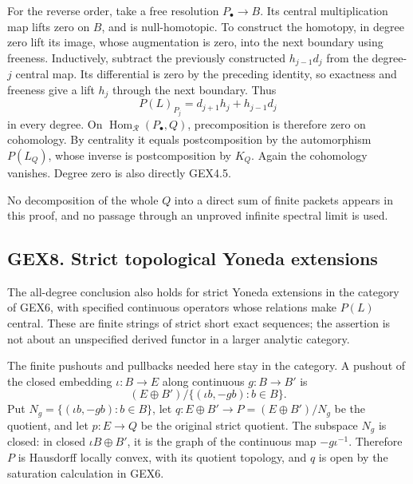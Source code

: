 For the reverse order, take a free resolution \(P_\bullet\to B\). Its
central multiplication map lifts zero on \(B\), and is null-homotopic.
To construct the homotopy, in degree zero lift its image, whose
augmentation is zero, into the next boundary using freeness.
Inductively, subtract the previously constructed \(h_{j-1}d_j\) from the
degree-\(j\) central map. Its differential is zero by the preceding
identity, so exactness and freeness give a lift \(h_j\) through the next
boundary. Thus \[
P(L)_{P_j}=d_{j+1}h_j+h_{j-1}d_j
\] in every degree. On \(\operatorname{Hom}_{\mathscr R}(P_\bullet,Q)\),
precomposition is therefore zero on cohomology. By centrality it equals
postcomposition by the automorphism \(P(L_Q)\), whose inverse is
postcomposition by \(K_Q\). Again the cohomology vanishes. Degree zero
is also directly GEX4.5.

No decomposition of the whole \(Q\) into a direct sum of finite packets
appears in this proof, and no passage through an unproved infinite
spectral limit is used.

\subsection{GEX8. Strict topological Yoneda
extensions}\label{gex8.-strict-topological-yoneda-extensions}

The all-degree conclusion also holds for strict Yoneda extensions in the
category of GEX6, with specified continuous operators whose relations
make \(P(L)\) central. These are finite strings of strict short exact
sequences; the assertion is not about an unspecified derived functor in
a larger analytic category.

The finite pushouts and pullbacks needed here stay in the category. A
pushout of the closed embedding \(\iota:B\to E\) along continuous
\(g:B\to B'\) is \[
(E\oplus B')/\{(\iota b,-gb):b\in B\}.
\tag{GEX8.1}
\] Put \(N_g=\{(\iota b,-gb):b\in B\}\), let
\(q:E\oplus B'\to P=(E\oplus B')/N_g\) be the quotient, and let
\(p:E\to Q\) be the original strict quotient. The subspace \(N_g\) is
closed: in closed \(\iota B\oplus B'\), it is the graph of the
continuous map \(-g\iota^{-1}\). Therefore \(P\) is Hausdorff locally
convex, with its quotient topology, and \(q\) is open by the saturation
calculation in GEX6.

